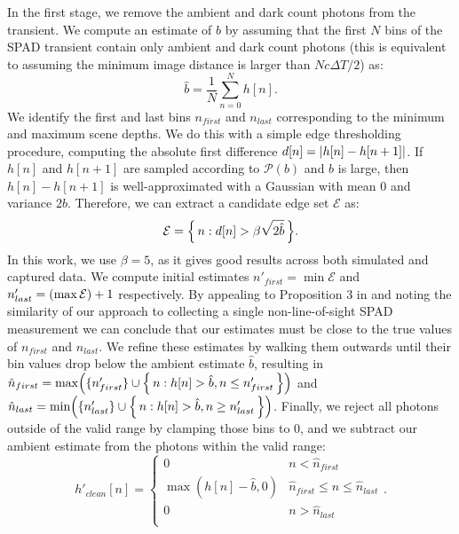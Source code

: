 In the first stage, we remove the ambient and dark count photons from the transient. 
We compute an estimate of $b$ by assuming that the first $N$ bins of the SPAD transient
contain only ambient and dark count photons (this is equivalent to assuming the
minimum image distance is larger than $Nc\Delta T/2$) as:
\begin{equation}
  \hat b = \frac{1}{N}\sum_{n=0}^N h[n]. 
  \label{eq:ambient_estimate}
\end{equation}
We identify the first and last bins $n_{first}$ and $n_{last}$
corresponding to the minimum and maximum scene depths. We do this with a simple
edge thresholding procedure, computing the absolute first difference $d[n] =
\abs{h[n] - h[n+1]}$. If $h[n]$ and $h[n+1]$ are sampled according to $\mathcal{P}(b)$ and $b$ is large, then 
$h[n] - h[n+1]$ is well-approximated with a Gaussian with mean $0$ and variance $2b$.
Therefore, we can extract a candidate edge set $\mathcal{E}$ as:
\begin{equation}
  \mathcal{E} = \mset{n}{d[n] > \beta\sqrt{2\hat b}}.
  \label{eq:edge_set}
\end{equation}
In this work, we use $\beta = 5$, as it gives good results across both simulated
and captured data.
We compute initial estimates $n'_{first} = \min \mathcal{E}$ and
$n'_{last} = \paren*{\max \mathcal{E}} + 1$ respectively. By appealing to Proposition 3 in
\cite{Xin2019} and noting the similarity of our approach to collecting a single
non-line-of-sight SPAD measurement we can conclude that our estimates must be
close to the true values of $n_{first}$ and $n_{last}$.
We refine these estimates by walking them outwards until their bin values drop
below the ambient estimate $\hat b$, resulting in
$\hat n_{first} = \max\paren*{\set{n'_{first}}\cup\mset{n}{h[n] > \hat b, n \leq n'_{first}}}$ and
$\hat n_{last} = \min\paren*{\set{n'_{last}}\cup\mset{n}{h[n] > \hat b, n \geq n'_{last}}}$.
Finally, we reject all photons outside of the valid range by clamping those bins
to 0, and we subtract our ambient estimate from the photons within the valid
range:
\begin{equation}
  h'_{clean}[n] = \begin{cases}
    0 & n < \hat n_{first} \\
    \max(h[n] - \hat b, 0) & \hat n_{first} \leq  n \leq \hat n_{last} \\
    0 & n > \hat n_{last} \\
  \end{cases}.
  \label{eq:h_clean}
\end{equation}


